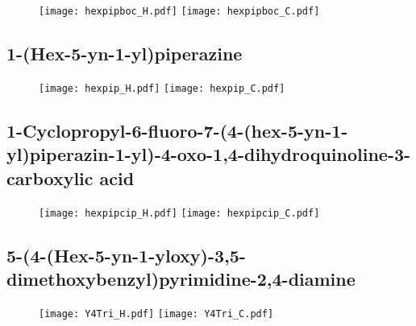 \begin{figure}[H]
	\centering
		\texttt{[image: hexpipboc\_H.pdf]}
		\texttt{[image: hexpipboc\_C.pdf]}
\end{figure}

\subsection{1-(Hex-5-yn-1-yl)piperazine }

\begin{figure}[H]
	\centering
		\texttt{[image: hexpip\_H.pdf]}
		\texttt{[image: hexpip\_C.pdf]}
\end{figure}

\subsection{1-Cyclopropyl-6-fluoro-7-(4-(hex-5-yn-1-yl)piperazin-1-yl)-4-oxo-1,4\hyp{}dihydro\-quinoline-3-carboxylic acid }

\begin{figure}[H]
	\centering
		\texttt{[image: hexpipcip\_H.pdf]}
		\texttt{[image: hexpipcip\_C.pdf]}
\end{figure}



\subsection{5-(4-(Hex-5-yn-1-yloxy)-3,5-dimethoxybenzyl)pyrimidine-2,4-diamine }

\begin{figure}[H]
	\centering
		\texttt{[image: Y4Tri\_H.pdf]}		\texttt{[image: Y4Tri\_C.pdf]}
\end{figure}

